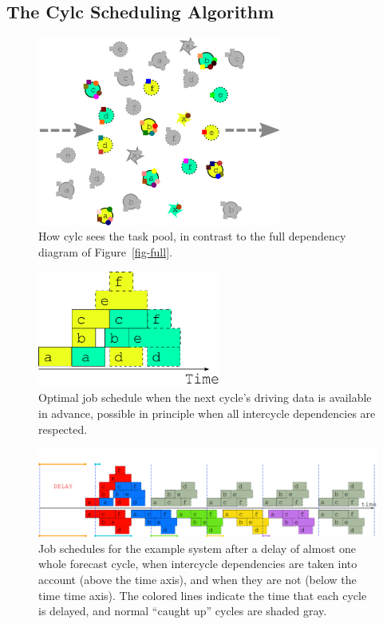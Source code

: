\documentclass[11pt,a4paper]{article}
\begin{document}
\subsection{The Cylc Scheduling Algorithm}

\begin{figure} 
    \begin{center} 
        \includegraphics[width=8cm]{inkscape-svg/task-pool}
    \end{center} 
    \caption{\small How cylc sees the task pool, in contrast to the 
    full dependency diagram of Figure~\ref{fig-full}.} 
    \label{fig-time-two}
\end{figure} 

\begin{figure}
    \begin{center}
        \includegraphics[width=6cm]{inkscape-svg/timeline-two-cycles-optimal} 
    \end{center}
    \caption{\small Optimal job schedule when the next cycle's driving
    data is available in advance, possible in principle when all
    intercycle dependencies are respected.} 
    \label{fig-optimal-two}
\end{figure} 

\begin{figure}
    \begin{center}
        \includegraphics[width=12cm]{inkscape-svg/timeline-three} 
    \end{center}
    \caption{\small Job schedules for the example system after a delay
    of almost one whole forecast cycle, when intercycle dependencies are
    taken into account (above the time axis), and when they are not
    (below the time time axis). The colored lines indicate the time that
    each cycle is delayed, and normal ``caught up'' cycles
    are shaded gray.} 
    \label{fig-time-three}
\end{figure} 
\end{document}
